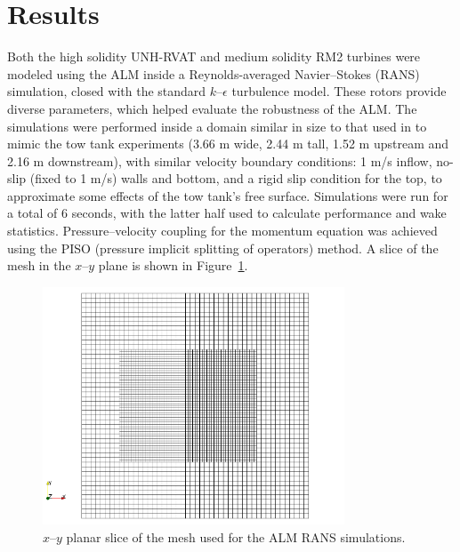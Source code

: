 \documentclass[times]{weauth}
\begin{document}
\section{Results}

Both the high solidity UNH-RVAT and medium solidity RM2 turbines were modeled
using the ALM inside a Reynolds-averaged Navier--Stokes (RANS) simulation,
closed with the standard $k$--$\epsilon$ turbulence model. These rotors provide
diverse parameters, which helped evaluate the robustness of the ALM. The
simulations were performed inside a domain similar in size to that used in
\cite{Bachant2016-BR-CFD} to mimic the tow tank experiments (3.66 m wide, 2.44 m
tall, 1.52 m upstream and 2.16 m downstream), with similar velocity boundary
conditions: 1 m/s inflow, no-slip (fixed to 1 m/s) walls and bottom, and a rigid
slip condition for the top, to approximate some effects of the tow tank's free
surface. Simulations were run for a total of 6 seconds, with the latter half
used to calculate performance and wake statistics. Pressure--velocity coupling
for the momentum equation was achieved using the PISO (pressure implicit
splitting of operators) method. A slice of the mesh in the $x$--$y$ plane is
shown in Figure~\ref{fig:ALM-mesh}.

\begin{figure}
    \centering

    \includegraphics[width=0.8\textwidth]{thesis_alm-mesh}

    \caption{$x$--$y$ planar slice of the mesh used for the ALM RANS
        simulations.}

    \label{fig:ALM-mesh}
\end{figure}
\end{document}
